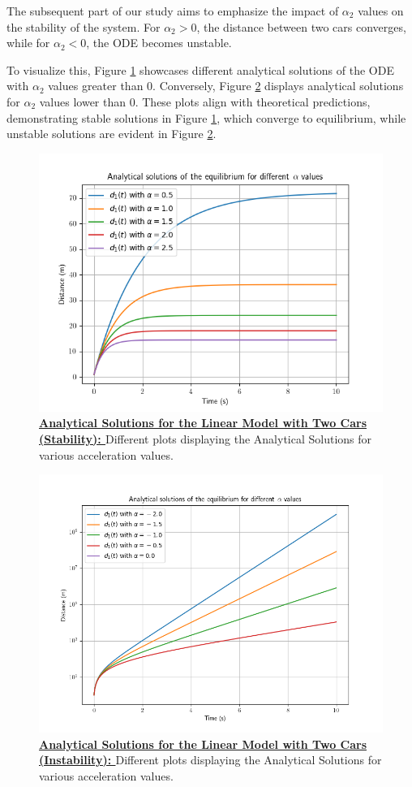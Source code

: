 \documentclass{article}
\begin{document}
		The subsequent part of our study aims to emphasize the impact of \(\alpha_2\) values on the stability of the system. For \(\alpha_2 > 0\), the distance between two cars converges, while for \(\alpha_2 < 0\), the ODE becomes unstable.
		
		To visualize this, Figure \ref{fig:AS1} showcases different analytical solutions of the ODE with \(\alpha_2\) values greater than 0. Conversely, Figure \ref{fig:AS2} displays analytical solutions for \(\alpha_2\) values lower than 0. These plots align with theoretical predictions, demonstrating stable solutions in Figure \ref{fig:AS1}, which converge to equilibrium, while unstable solutions are evident in Figure \ref{fig:AS2}.
		
		\begin{figure}[H]
			\centering
			\includegraphics[width=0.8\linewidth]{Stability.png}
			\caption[Analytical Solutions for the Linear Model with Two Cars]{\textbf{\underline{Analytical Solutions for the Linear Model with Two Cars (Stability): }}Different plots displaying the Analytical Solutions for various acceleration values.}
			\label{fig:AS1}
		\end{figure}
		
		\begin{figure}[H]
			\centering
			\includegraphics[width=0.8\linewidth]{Unstability.png}
			\caption[Analytical Solutions for the Linear Model with Two Cars]{\textbf{\underline{Analytical Solutions for the Linear Model with Two Cars (Instability): }}Different plots displaying the Analytical Solutions for various acceleration values.}
			\label{fig:AS2}
		\end{figure}
		
\end{document}
